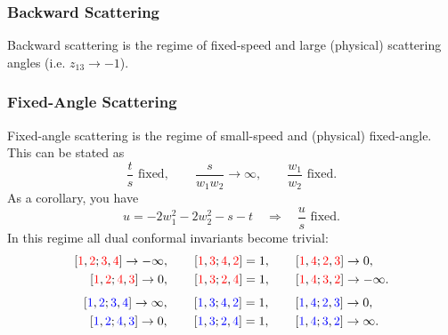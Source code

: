 \subsubsection{Backward Scattering}
Backward scattering is the regime of fixed-speed and large (physical) scattering angles (i.e. $z_{13} \rightarrow -1$).
\subsubsection{Fixed-Angle Scattering}
Fixed-angle scattering is the regime of small-speed and (physical) fixed-angle. This can be stated as
\begin{equation}
	\frac{t}{s} \text{ fixed}, \qquad \frac{s}{w_{1} w_{2}} \rightarrow \infty, \qquad \frac{w_{1}}{w_{2}} \text{ fixed}.
\end{equation}
As a corollary, you have
\begin{equation}
	u = - 2w_{1}^{2} - 2w_{2}^{2} - s - t \quad \Longrightarrow \quad \frac{u}{s} \text{ fixed}.
\end{equation}
In this regime all dual conformal invariants become trivial:
\begin{equation}
\begin{split}
	\left[ {\color{red} 1} , {\color{red} 2} ; {\color{red} 3} , {\color{red} 4} \right] \rightarrow -\infty, \qquad
	\left[ {\color{red} 1} , {\color{red} 3} ; {\color{red} 4} , {\color{red} 2} \right] &= 1, \qquad
	\left[ {\color{red} 1} , {\color{red} 4} ; {\color{red} 2} , {\color{red} 3} \right] \rightarrow 0, \\
	\left[ {\color{red} 1} , {\color{red} 2} ; {\color{red} 4} , {\color{red} 3} \right] \rightarrow 0, \qquad
	\left[ {\color{red} 1} , {\color{red} 3} ; {\color{red} 2} , {\color{red} 4} \right] &= 1, \qquad
	\left[ {\color{red} 1} , {\color{red} 4} ; {\color{red} 3} , {\color{red} 2} \right] \rightarrow -\infty.
\end{split}
\end{equation}
\begin{equation}
\begin{split}
	\left[ {\color{blue} 1} , {\color{blue} 2} ; {\color{blue} 3} , {\color{blue} 4} \right] \rightarrow \infty, \qquad
	\left[ {\color{blue} 1} , {\color{blue} 3} ; {\color{blue} 4} , {\color{blue} 2} \right] &= 1, \qquad
	\left[ {\color{blue} 1} , {\color{blue} 4} ; {\color{blue} 2} , {\color{blue} 3} \right] \rightarrow 0, \\
	\left[ {\color{blue} 1} , {\color{blue} 2} ; {\color{blue} 4} , {\color{blue} 3} \right] \rightarrow 0, \qquad
	\left[ {\color{blue} 1} , {\color{blue} 3} ; {\color{blue} 2} , {\color{blue} 4} \right] &= 1, \qquad
	\left[ {\color{blue} 1} , {\color{blue} 4} ; {\color{blue} 3} , {\color{blue} 2} \right] \rightarrow \infty.
\end{split}
\end{equation}
